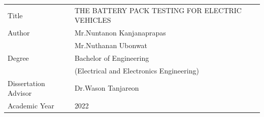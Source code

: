 %

\frontmatter
\noindent\begin{tabularx}{\linewidth}{@{}l@{\qquad}X@{}}
Title							& \parbox[t]{\linewidth}
{\strut\expandafter\uppercase\expandafter{The Battery Pack Testing For Electric Vehicles}\strut}\\
Author									& Mr.Nuntanon Kanjanaprapas\\
										& Mr.Nuthanan Ubonwat\\
Degree									& Bachelor of Engineering\\
										& (Electrical and Electronics Engineering)\\
Dissertation Advisor					& Dr.Wason Tanjareon\\
Academic Year							& 2022
\end{tabularx}

\cleardoublepage
\newpage




\cleardoublepage
\newpage






\makeatother





